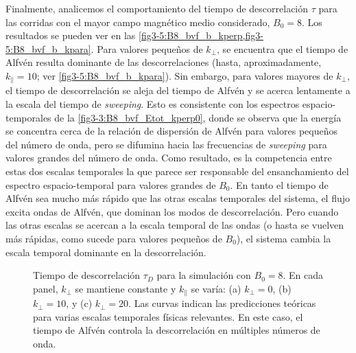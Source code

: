Finalmente, analicemos el comportamiento del tiempo de descorrelación
$\tau$ para las corridas con el mayor campo magnético medio
considerado, $B_0=8$. Los resultados se pueden ver en las
\cref{fig3-5:B8_bvf_b_kperp,fig3-5:B8_bvf_b_kpara}. Para valores pequeños
de $k_\perp$, se encuentra que el tiempo de Alfvén resulta dominante
de las descorrelaciones (hasta, aproximadamente, $k_\parallel = 10$;
ver \cref{fig3-5:B8_bvf_b_kpara}). Sin embargo, para valores mayores
de $k_{\perp}$, el tiempo de descorrelación se aleja del tiempo de
Alfvén y se acerca lentamente a la escala del tiempo
de \textit{sweeping}. Esto es consistente con los espectros
espacio-temporales de la
\cref{fig3-3:B8_bvf_Etot_kperp0}, donde se observa que la energía se
concentra cerca de la relación de dispersión de Alfvén para valores
pequeños del número de onda, pero se difumina hacia las frecuencias de
\textit{sweeping} para valores grandes del número de onda.  Como resultado, es
la competencia entre estas dos escalas temporales la que parece ser
responsable del ensanchamiento del espectro espacio-temporal para
valores grandes de $B_0$. En tanto el tiempo de Alfvén sea mucho más
rápido que las otras escalas temporales del sistema, el flujo excita
ondas de Alfvén, que dominan los modos de descorrelación. Pero cuando
las otras escalas se acercan a la escala temporal de las ondas (o
hasta se vuelven más rápidas, como sucede para valores pequeños de
$B_0$), el sistema cambia la escala temporal dominante en la
descorrelación.

\begin{figure}
  \centering

  \caption{Tiempo de descorrelación $\tau_D$ para la simulación con
    $B_0=8$. En cada panel, $k_\perp$ se mantiene constante y
    $k_\parallel$ se varía: (a) $k_\perp = 0$, (b) $k_\perp = 10$,
    y (c) $k_\perp = 20$. Las curvas indican las predicciones teóricas
    para varias escalas temporales físicas relevantes. En este caso,
    el tiempo de Alfv\'en controla la descorrelación en múltiples
    números de onda.}
  \label{fig3-5:B8_bvf_b_kperp}
\end{figure}

